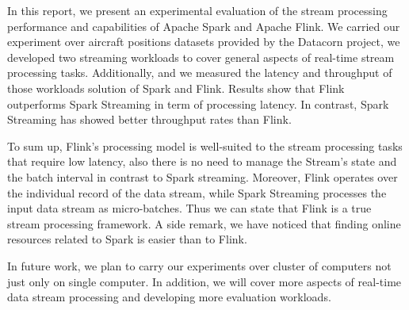 \documentclass[]{article}
\begin{document}
In this report, we present an experimental evaluation of the stream processing performance and capabilities of Apache Spark and Apache Flink. We carried our experiment over aircraft positions datasets provided by the Datacorn project, we developed two streaming workloads to cover general aspects of real-time stream processing tasks. Additionally, and we measured the latency and throughput of those workloads solution of Spark and Flink. Results show that Flink outperforms Spark Streaming in term of processing latency. In contrast, Spark Streaming has showed better throughput rates than Flink. 
\par To sum up, Flink's processing model is well-suited to the stream processing tasks that require low latency, also there is no need to manage the Stream's state and the batch interval in contrast to Spark streaming. Moreover, Flink operates over the individual record of the data stream, while Spark Streaming  processes the input data stream as micro-batches. Thus we can state that  Flink is a true stream processing framework. A side remark, we have  noticed that finding online resources related to Spark is easier than to Flink.

In future work, we plan to carry our experiments over cluster of computers not just only on single computer. In addition, we will cover more aspects of real-time data stream processing and developing more evaluation workloads. 
\end{document}
